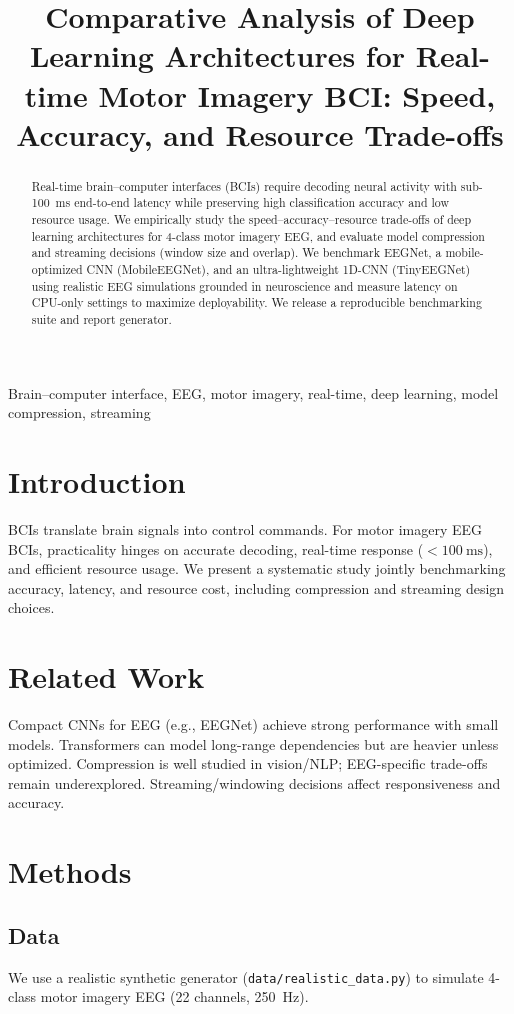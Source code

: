 ﻿\documentclass[conference]{IEEEtran}
\title{Comparative Analysis of Deep Learning Architectures for Real-time Motor Imagery BCI: Speed, Accuracy, and Resource Trade-offs}
\author{\IEEEauthorblockN{dbrooks2}
\IEEEauthorblockA{Neural-Decoder Project\\
\texttt{github.com/Dbrooks2/Neural-Decoder}}
}
\begin{document}
\maketitle
\begin{abstract}
Real-time brain--computer interfaces (BCIs) require decoding neural activity with sub-\SI{100}{\milli\second} end-to-end latency while preserving high classification accuracy and low resource usage. We empirically study the speed--accuracy--resource trade-offs of deep learning architectures for 4-class motor imagery EEG, and evaluate model compression and streaming decisions (window size and overlap). We benchmark EEGNet, a mobile-optimized CNN (MobileEEGNet), and an ultra-lightweight 1D-CNN (TinyEEGNet) using realistic EEG simulations grounded in neuroscience and measure latency on CPU-only settings to maximize deployability. We release a reproducible benchmarking suite and report generator.
\end{abstract}
\begin{IEEEkeywords}
Brain--computer interface, EEG, motor imagery, real-time, deep learning, model compression, streaming
\end{IEEEkeywords}
\section{Introduction}
BCIs translate brain signals into control commands. For motor imagery EEG BCIs, practicality hinges on accurate decoding, real-time response ($<\SI{100}{\milli\second}$), and efficient resource usage. We present a systematic study jointly benchmarking accuracy, latency, and resource cost, including compression and streaming design choices.
\section{Related Work}
Compact CNNs for EEG (e.g., EEGNet) achieve strong performance with small models. Transformers can model long-range dependencies but are heavier unless optimized. Compression is well studied in vision/NLP; EEG-specific trade-offs remain underexplored. Streaming/windowing decisions affect responsiveness and accuracy.
\section{Methods}
\subsection{Data}
We use a realistic synthetic generator (\texttt{data/realistic\eeg\_data.py}) to simulate 4-class motor imagery EEG (22 channels, \SI{250}{\Hz}).
\end{document}
